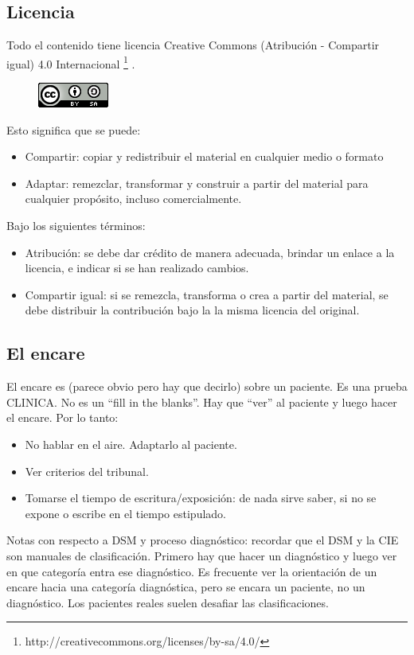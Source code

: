 \subsection*{Licencia}
Todo el contenido tiene licencia Creative Commons (Atribución - Compartir igual) 4.0 Internacional \footnote{http://creativecommons.org/licenses/by-sa/4.0/} .
\begin{figure}
	\centering
	\includegraphics{cc.png}
\end{figure}
Esto significa que se puede:
\begin{itemize}
\item Compartir: copiar y redistribuir el material en cualquier medio o formato
\item Adaptar: remezclar, transformar y construir a partir del material para cualquier propósito, incluso comercialmente.
\end{itemize}
Bajo los siguientes términos:
\begin{itemize}
	\item Atribución: se debe dar crédito de manera adecuada, brindar un enlace a la licencia, e indicar si se han realizado cambios.
	\item Compartir igual: si se remezcla, transforma o crea a partir del material, se debe distribuir la contribución bajo la la misma licencia del original.
\end{itemize}
\subsection*{El encare}
El encare es (parece obvio pero hay que decirlo) sobre un paciente. Es una prueba CLINICA. No es un ``fill in the blanks''. Hay que ``ver'' al paciente y luego hacer el encare. Por lo tanto:
\begin{itemize}
	\item No hablar en el aire. Adaptarlo al paciente.
	\item Ver criterios del tribunal.
	\item Tomarse el tiempo de escritura/exposición: de nada sirve saber, si no se expone o escribe en el tiempo estipulado.
\end{itemize}
Notas con respecto a DSM y proceso diagnóstico: recordar que el DSM y la CIE son manuales de clasificación. Primero hay que hacer un diagnóstico y luego ver en que categoría entra ese diagnóstico. Es frecuente ver la orientación de un encare hacia una categoría diagnóstica, pero se encara un paciente, no un diagnóstico. Los pacientes reales suelen desafiar las clasificaciones.

